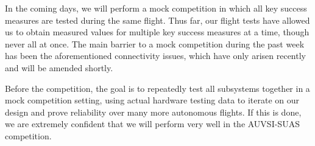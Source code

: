 \documentclass[]{auvsi_doc}
\begin{document}
In the coming days, we will perform a mock competition in which all key success measures are tested during the same flight. Thus far, our flight tests have allowed us to obtain measured values for multiple key success measures at a time, though never all at once. The main barrier to a mock competition during the past week has been the aforementioned connectivity issues, which have only arisen recently and will be amended shortly.

Before the competition, the goal is to repeatedly test all subsystems together in a mock competition setting, using actual hardware testing data to iterate on our design and prove reliability over many more autonomous flights. If this is done, we are extremely confident that we will perform very well in the AUVSI-SUAS competition.

\end{document}
